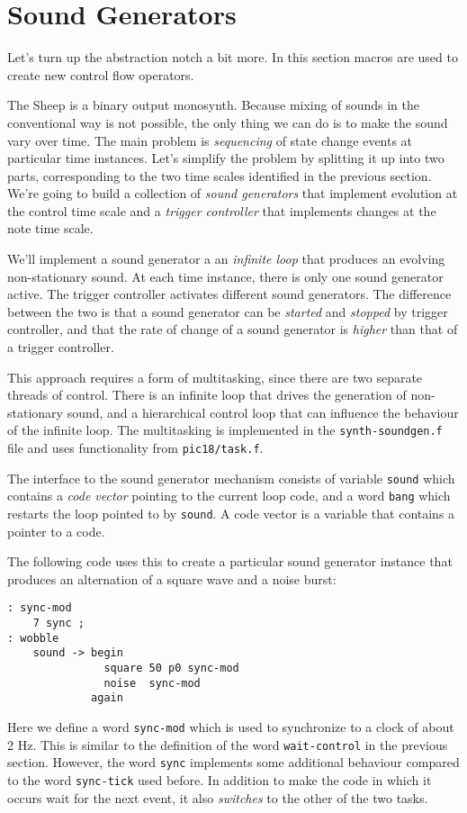 \documentclass[12pt]{article}
\begin{document}


\section{Sound Generators}

Let's turn up the abstraction notch a bit more. In this section macros
are used to create new control flow operators. 

The Sheep is a binary output monosynth. Because mixing of sounds in
the conventional way is not possible, the only thing we can do is to
make the sound vary over time. The main problem is \emph{sequencing}
of state change events at particular time instances. Let's simplify
the problem by splitting it up into two parts, corresponding to the
two time scales identified in the previous section. We're going to
build a collection of \emph{sound generators} that implement evolution
at the control time scale and a \emph{trigger controller} that
implements changes at the note time scale.

We'll implement a sound generator a an \emph{infinite loop} that
produces an evolving non-stationary sound. At each time instance,
there is only one sound generator active. The trigger controller
activates different sound generators. The difference between the two
is that a sound generator can be \emph{started} and \emph{stopped} by
trigger controller, and that the rate of change of a sound generator
is \emph{higher} than that of a trigger controller.

This approach requires a form of multitasking, since there are two
separate threads of control. There is an infinite loop that drives the
generation of non-stationary sound, and a hierarchical control loop
that can influence the behaviour of the infinite loop. The
multitasking is implemented in the \verb|synth-soundgen.f| file and
uses functionality from \verb|pic18/task.f|. 

The interface to the sound generator mechanism consists of variable
\verb|sound| which contains a \emph{code vector} pointing to the
current loop code, and a word \verb|bang| which restarts the loop
pointed to by \verb|sound|. A code vector is a variable that contains
a pointer to a code. 

The following code uses this to create a particular sound generator
instance that produces an alternation of a square wave and a noise
burst:
\begin{verbatim}
: sync-mod
    7 sync ;
: wobble
    sound -> begin
               square 50 p0 sync-mod
               noise  sync-mod
             again
\end{verbatim}
Here we define a word \verb|sync-mod| which is used to synchronize to
a clock of about 2 Hz. This is similar to the definition of the word
\verb|wait-control| in the previous section. However, the word
\verb|sync| implements some additional behaviour compared to the word
\verb|sync-tick| used before. In addition to make the code in which it
occurs wait for the next event, it also \emph{switches} to the other
of the two tasks.
\end{document}
